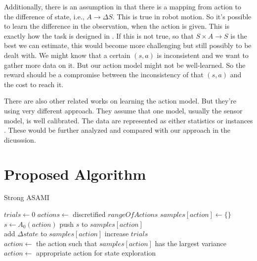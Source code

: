 \documentclass[10pt]{IEEEtran}
\begin{document}
Additionally, there is an assumption in \cite{CSJ06} that there is a
mapping from action to the difference of state, i.e., $A \rightarrow
\Delta S$.  This is true in robot motion. So it's possible to learn
the difference in the observation, when the action is given. This is
exactly how the task is designed in \cite{ICDL10-hester}. If this is
not true, so that $S \times A \rightarrow S$ is the best we can
estimate, this would become more challenging but still possibly to be
dealt with. We might know that a certain $(s, a)$ is inconsistent and
we want to gather more data on it. But our action model might not be
well-learned. So the reward should be a compromise between the
inconsistency of that $(s, a)$ and the cost to reach it.

There are also other related works on learning the action model. But
they're using very different approach. They assume that one model,
usually the sensor model, is well calibrated. The data are represented
as either statistics \cite{And_learningand} or instances
\cite{LNAI2007-ahmadi}. These would be further analyzed and compared
with our approach in the dicusssion.

\section{Proposed Algorithm}

\begin{algorithm*}
\caption{Strong ASAMI}\label{alg:asami}
\begin{algorithmic}[1]
    \State $trials\gets 0$
    \State $actions \gets$ discretified $rangeOfActions$
        \State $samples[action] \gets \{\}$ \label{asa:actInit}
        \State $s \gets A_0(action)$
	\State push $s$ to $samples[action]$
    \EndFor
\EndFunction
\\
 \label{asa:update}
    \State add $\Delta state$ to $samples[action]$
    \State increase $trials$
\EndFunction
\\
 \label{asa:getAct}
        \State $action \gets$ the action such that $samples[action]$ has the largest variance
    \Else
        \State $action \gets$ appropriate action for state exploration
    \EndIf
\EndFunction
\end{algorithmic}
\end{algorithm*}
\end{document}
